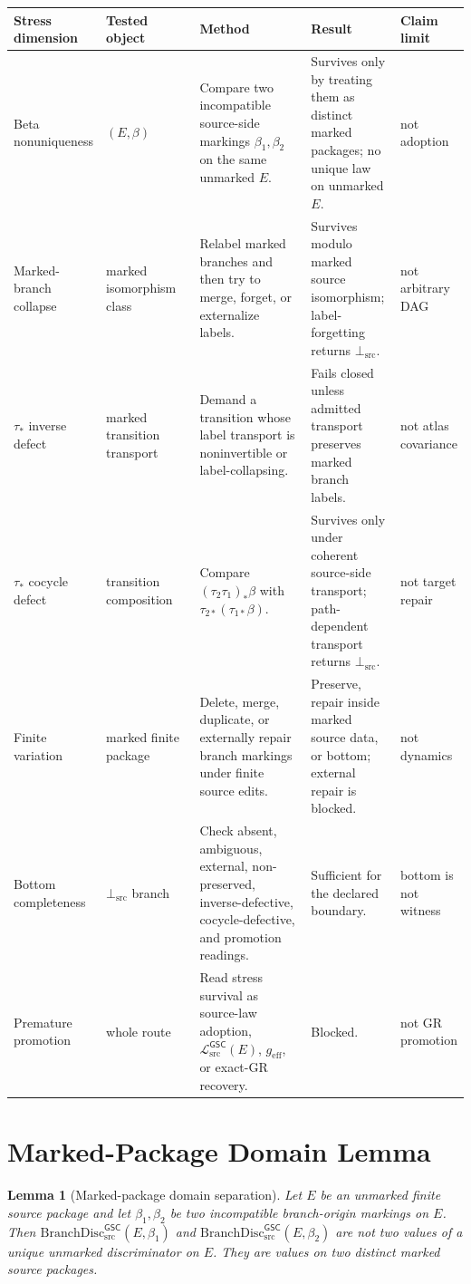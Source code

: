 \documentclass[11pt]{article}
\newcommand{\MetricData}{\mathcal{L}_{\mathrm{src}}^{\mathsf{GSC}}}
\newcommand{\BottomSrc}{\bot_{\mathrm{src}}}
\newcommand{\geff}{g_{\mathrm{eff}}}
\newcommand{\BranchDisc}{\mathrm{BranchDisc}_{\mathrm{src}}^{\mathsf{GSC}}}
\newtheorem{lemma}{Lemma}
\begin{document}
\begin{longtable}{p{0.17\linewidth}p{0.22\linewidth}p{0.29\linewidth}p{0.20\linewidth}p{0.12\linewidth}}
\toprule
Stress dimension & Tested object & Method & Result & Claim limit \\
\midrule
Beta nonuniqueness &
\((E,\beta)\) &
Compare two incompatible source-side markings \(\beta_1,\beta_2\) on the
same unmarked \(E\). &
Survives only by treating them as distinct marked packages; no unique law on
unmarked \(E\). &
not adoption \\
Marked-branch collapse &
marked isomorphism class &
Relabel marked branches and then try to merge, forget, or externalize labels. &
Survives modulo marked source isomorphism; label-forgetting returns
\(\BottomSrc\). &
not arbitrary DAG \\
\(\tau_\ast\) inverse defect &
marked transition transport &
Demand a transition whose label transport is noninvertible or label-collapsing. &
Fails closed unless admitted transport preserves marked branch labels. &
not atlas covariance \\
\(\tau_\ast\) cocycle defect &
transition composition &
Compare \((\tau_2\tau_1)_\ast\beta\) with
\(\tau_{2\ast}(\tau_{1\ast}\beta)\). &
Survives only under coherent source-side transport; path-dependent transport
returns \(\BottomSrc\). &
not target repair \\
Finite variation &
marked finite package &
Delete, merge, duplicate, or externally repair branch markings under finite
source edits. &
Preserve, repair inside marked source data, or bottom; external repair is
blocked. &
not dynamics \\
Bottom completeness &
\(\BottomSrc\) branch &
Check absent, ambiguous, external, non-preserved, inverse-defective,
cocycle-defective, and promotion readings. &
Sufficient for the declared boundary. &
bottom is not witness \\
Premature promotion &
whole route &
Read stress survival as source-law adoption, \(\MetricData(E)\), \(\geff\),
or exact-GR recovery. &
Blocked. &
not GR promotion \\
\bottomrule
\end{longtable}

\section{Marked-Package Domain Lemma}

\begin{lemma}[Marked-package domain separation]
Let \(E\) be an unmarked finite source package and let \(\beta_1,\beta_2\) be
two incompatible branch-origin markings on \(E\). Then
\(\BranchDisc(E,\beta_1)\) and \(\BranchDisc(E,\beta_2)\) are not two values
of a unique unmarked discriminator on \(E\). They are values on two distinct
marked source packages.
\end{lemma}
\end{document}
